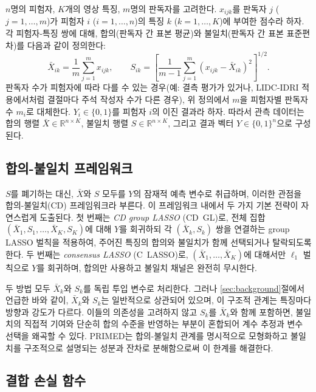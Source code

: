 \documentclass[a4paper,11pt]{article}
\begin{document}
$n$명의 피험자, $K$개의 영상 특징, $m$명의 판독자를 고려한다.
$x_{ijk}$를 판독자 $j$ ($j = 1,\dots,m$)가 피험자 $i$ ($i = 1,\dots,n$)의 특징 $k$ ($k = 1,\dots,K$)에 부여한 점수라 하자.
각 피험자-특징 쌍에 대해, 합의(판독자 간 표본 평균)와 불일치(판독자 간 표본 표준편차)를 다음과 같이 정의한다:
\[
  \bar X_{ik} = \frac{1}{m}\sum_{j=1}^m x_{ijk}, \qquad
  S_{ik} = \left[\frac{1}{m-1}\sum_{j=1}^m (x_{ijk} - \bar X_{ik})^2\right]^{1/2}.
\]
판독자 수가 피험자에 따라 다를 수 있는 경우(예: 결측 평가가 있거나, LIDC-IDRI 적용에서처럼 결절마다 주석 작성자 수가 다른 경우), 위 정의에서 $m$을 피험자별 판독자 수 $m_i$로 대체한다.
$Y_i \in \{0,1\}$를 피험자 $i$의 이진 결과라 하자.
따라서 관측 데이터는 합의 행렬 $\bar X \in \mathbb{R}^{n \times K}$, 불일치 행렬 $S \in \mathbb{R}^{n \times K}$, 그리고 결과 벡터 $Y \in \{0,1\}^n$으로 구성된다.

\subsection{합의-불일치 프레임워크}\label{sec:cd_framework}

$S$를 폐기하는 대신, $\bar X$와 $S$ 모두를 $Y$의 잠재적 예측 변수로 취급하며, 이러한 관점을 합의-불일치(CD) 프레임워크라 부른다.
이 프레임워크 내에서 두 가지 기본 전략이 자연스럽게 도출된다.
첫 번째는 \emph{CD group LASSO} (CD~GL)로, 전체 집합 $(\bar X_1, S_1, \dots, \bar X_K, S_K)$에 대해 $Y$를 회귀하되 각 $(\bar X_k, S_k)$ 쌍을 연결하는 group LASSO 벌칙을 적용하여, 주어진 특징의 합의와 불일치가 함께 선택되거나 탈락되도록 한다.
두 번째는 \emph{consensus LASSO} (C~LASSO)로, $(\bar X_1, \dots, \bar X_K)$에 대해서만 $\ell_1$ 벌칙으로 $Y$를 회귀하며, 합의만 사용하고 불일치 채널은 완전히 무시한다.

두 방법 모두 $\bar X_k$와 $S_k$를 독립 투입 변수로 처리한다.
그러나 \ref{sec:background}절에서 언급한 바와 같이, $\bar X_k$와 $S_k$는 일반적으로 상관되어 있으며, 이 구조적 관계는 특징마다 방향과 강도가 다르다.
이들의 의존성을 고려하지 않고 $S_k$를 $\bar X_k$와 함께 포함하면, 불일치의 직접적 기여와 단순히 합의 수준을 반영하는 부분이 혼합되어 계수 추정과 변수 선택을 왜곡할 수 있다.
PRIMED는 합의-불일치 관계를 명시적으로 모형화하고 불일치를 구조적으로 설명되는 성분과 잔차로 분해함으로써 이 한계를 해결한다.

\subsection{결합 손실 함수}\label{sec:joint_loss}
\end{document}
